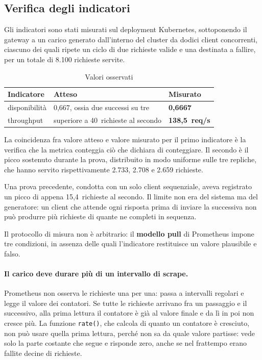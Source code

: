 \documentclass[12pt,a4paper]{article}
\begin{document}
\subsection{Verifica degli indicatori}

Gli indicatori sono stati misurati sul deployment Kubernetes, sottoponendo il gateway a un carico
generato dall'interno del cluster da dodici client concorrenti, ciascuno dei quali ripete un ciclo
di due richieste valide e una destinata a fallire, per un totale di 8.100 richieste servite.

\begin{table}[H]
\centering
\caption{Valori osservati}
\begin{tabularx}{\textwidth}{lXl}
\toprule
\textbf{Indicatore} & \textbf{Atteso} & \textbf{Misurato} \\
\midrule
disponibilit\`a & 0,667, ossia due successi su tre & \textbf{0,6667} \\
throughput & superiore a 40~richieste al secondo & \textbf{138,5~req/s} \\
\bottomrule
\end{tabularx}
\end{table}

La coincidenza fra valore atteso e valore misurato per il primo indicatore \`e la verifica che la
metrica conteggia ci\`o che dichiara di conteggiare. Il secondo \`e il picco sostenuto durante la
prova, distribuito in modo uniforme sulle tre repliche, che hanno servito rispettivamente 2.733,
2.708 e 2.659 richieste.

Una prova precedente, condotta con un solo client sequenziale, aveva registrato un picco di appena
15,4~richieste al secondo. Il limite non era del sistema ma del generatore: un client che attende
ogni risposta prima di inviare la successiva non pu\`o produrre pi\`u richieste di quante ne
completi in sequenza.

Il protocollo di misura non \`e arbitrario: il \textbf{modello pull} di Prometheus impone tre
condizioni, in assenza delle quali l'indicatore restituisce un valore plausibile e falso.

\paragraph{Il carico deve durare pi\`u di un intervallo di scrape.} Prometheus non osserva le
richieste una per una: passa a intervalli regolari e legge il valore dei contatori. Se tutte le
richieste arrivano fra un passaggio e il successivo, alla prima lettura il contatore \`e gi\`a al
valore finale e da l\`i in poi non cresce pi\`u. La funzione \texttt{rate()}, che calcola di quanto
un contatore \`e cresciuto, non pu\`o usare quella prima lettura, perch\'e non sa da quale valore
partisse: vede solo la parte costante che segue e risponde zero, anche se nel frattempo erano
fallite decine di richieste.
\end{document}
